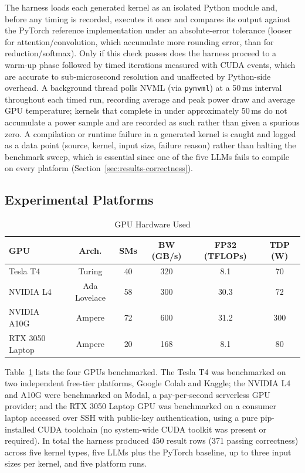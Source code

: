 \documentclass[conference]{IEEEtran}
\begin{document}
The harness loads each generated kernel as an isolated Python module and, before any timing is
recorded, executes it once and compares its output against the PyTorch reference implementation
under an absolute-error tolerance (looser for attention/convolution, which accumulate more
rounding error, than for reduction/softmax). Only if this check passes does the harness proceed to
a warm-up phase followed by timed iterations measured with CUDA events, which are accurate to
sub-microsecond resolution and unaffected by Python-side overhead. A background thread polls
NVML (via \texttt{pynvml}) at a 50\,ms interval throughout each timed run, recording average and
peak power draw and average GPU temperature; kernels that complete in under approximately 50\,ms
do not accumulate a power sample and are recorded as such rather than given a spurious zero. A
compilation or runtime failure in a generated kernel is caught and logged as a data point (source,
kernel, input size, failure reason) rather than halting the benchmark sweep, which is essential
since one of the five LLMs fails to compile on every platform (Section~\ref{sec:results-correctness}).

\subsection{Experimental Platforms}

\begin{table}[htbp]
\caption{GPU Hardware Used}
\label{tab:gpus}
\centering
\begin{tabular}{@{}lccccc@{}}
\toprule
GPU & Arch. & SMs & BW (GB/s) & FP32 (TFLOPs) & TDP (W) \\
\midrule
Tesla T4 & Turing & 40 & 320 & 8.1 & 70 \\
NVIDIA L4 & Ada Lovelace & 58 & 300 & 30.3 & 72 \\
NVIDIA A10G & Ampere & 72 & 600 & 31.2 & 300 \\
RTX 3050 Laptop & Ampere & 20 & 168 & 8.1 & 80 \\
\bottomrule
\end{tabular}
\end{table}

Table~\ref{tab:gpus} lists the four GPUs benchmarked. The Tesla T4 was benchmarked on two
independent free-tier platforms, Google Colab and Kaggle; the NVIDIA L4 and A10G were benchmarked
on Modal, a pay-per-second serverless GPU provider; and the RTX 3050 Laptop GPU was benchmarked
on a consumer laptop accessed over SSH with public-key authentication, using a pure pip-installed
CUDA toolchain (no system-wide CUDA toolkit was present or required). In total the harness produced
450 result rows (371 passing correctness) across five kernel types, five LLMs plus the PyTorch
baseline, up to three input sizes per kernel, and five platform runs.
\end{document}
